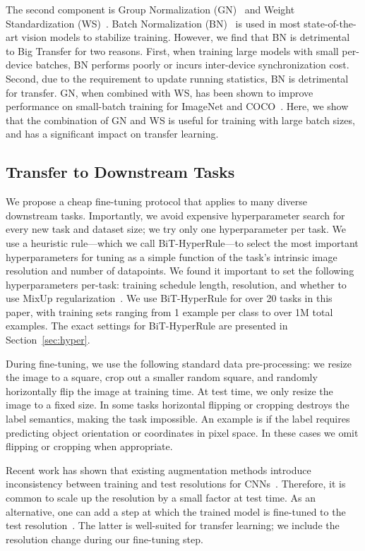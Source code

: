 \documentclass[runningheads]{llncs}
\newcommand{\hyper}{{BiT-HyperRule}}
\begin{document}
The second component is Group Normalization (GN)~\cite{wu2018group} and Weight Standardization (WS)~\cite{lin2014microsoft}.
Batch Normalization (BN)~\cite{ioffe2015batch} is used in most state-of-the-art vision models to stabilize training.
However, we find that BN is detrimental to Big Transfer for two reasons.
First, when training large models with small per-device batches, BN performs poorly or incurs inter-device synchronization cost.
Second, due to the requirement to update running statistics, BN is detrimental for transfer.
GN, when combined with WS, has been shown to improve performance on small-batch training for ImageNet and COCO~\cite{lin2014microsoft}.
Here, we show that the combination of GN and WS is useful for training with large batch sizes, and has a significant impact on transfer learning.

\subsection{Transfer to Downstream Tasks}
\label{sec:methods_downstream}

We propose a cheap fine-tuning protocol that applies to many diverse downstream tasks.
Importantly, we avoid expensive hyperparameter search for every new task and dataset size; we try only one hyperparameter per task.
We use a heuristic rule---which we call \hyper{}---to select the most important hyperparameters for tuning as a simple function of the task's intrinsic image resolution and number of datapoints.
We found it important to set the following hyperparameters per-task: training schedule length, resolution, and whether to use MixUp regularization~\cite{mixup}.
We use \hyper{} for over 20 tasks in this paper, with training sets ranging from 1 example per class to over 1M total examples.
The exact settings for \hyper{} are presented in Section~\ref{sec:hyper}.

During fine-tuning, we use the following standard data pre-processing:
we resize the image to a square, crop out a smaller random square, and randomly horizontally flip the image at training time.
At test time, we only resize the image to a fixed size.
In some tasks horizontal flipping or cropping destroys the label semantics, making the task impossible. An example is if the label requires predicting object orientation or coordinates in pixel space.
In these cases we omit flipping or cropping when appropriate.

Recent work has shown that existing augmentation methods introduce inconsistency between training and test resolutions for CNNs~\cite{fixres}.
Therefore, it is common to scale up the resolution by a small factor at test time.
As an alternative, one can add a step at which the trained model is fine-tuned to the test resolution~\cite{fixres}.
The latter is well-suited for transfer learning; we include the resolution change during our fine-tuning step.
\end{document}
